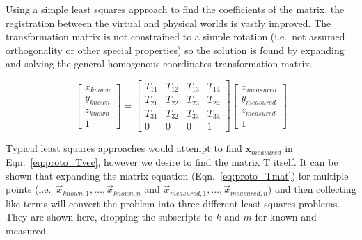Using a simple least squares approach to find the coefficients of the matrix, the registration between the virtual and physical worlds is vastly improved.
The transformation matrix is not constrained to a simple rotation (i.e.\ not assumed orthogonality or other special properties) so the solution is found by expanding and solving the general homogenous coordinates transformation matrix.

\begin{equation}
    \begin{bmatrix}
        x_{known} \\
        y_{known} \\
        z_{known} \\
        1
    \end{bmatrix} =
    \begin{bmatrix}
        T_{11} & T_{12} & T_{13} &T_{14} \\
        T_{21} & T_{22} & T_{23} &T_{24} \\
        T_{31} & T_{32} & T_{33} &T_{34} \\
        0 & 0 & 0 & 1
    \end{bmatrix}
    \begin{bmatrix}
        x_{measured} \\
        y_{measured} \\
        z_{measured} \\
        1
    \end{bmatrix}
    \label{eq:proto_Tmat}
\end{equation}

Typical least squares approaches would attempt to find $\mathbf{x}_{measured}$ in Eqn.\ \ref{eq:proto_Tvec}, however we desire to find the matrix T itself.
It can be shown that expanding the matrix equation (Eqn.\ \ref{eq:proto_Tmat}) for multiple points (i.e.\ $\vec{x}_{known,1},\dots,\vec{x}_{known,n}$ and $\vec{x}_{measured,1},\dots,\vec{x}_{measured,n}$) and then collecting like terms will convert the problem into three different least squares problems.
They are shown here, dropping the subscripts to $k$ and $m$ for known and measured.

